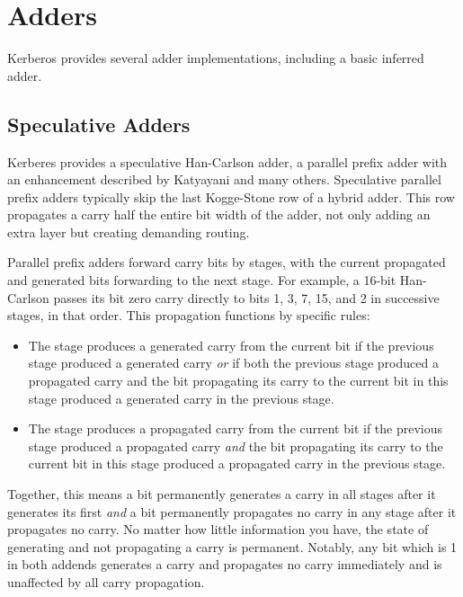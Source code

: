 \chapter{Adders}

Kerberos provides several adder implementations, including a basic inferred
adder.

\section{Speculative Adders}

Kerberes provides a speculative Han-Carlson adder, a parallel prefix adder with
an enhancement described by Katyayani and many others.  Speculative parallel
prefix adders typically skip the last Kogge-Stone row of a hybrid adder.  This
row propagates a carry half the entire bit width of the adder, not only adding
an extra layer but creating demanding routing.

Parallel prefix adders forward carry bits by stages, with the current
propagated and generated bits forwarding to the next stage.  For example, a
16-bit Han-Carlson passes its bit zero carry directly to bits 1, 3, 7, 15, and
2 in successive stages, in that order.  This propagation functions by specific
rules:

\begin{itemize}
    \item The stage produces a generated carry from the current bit if the
    previous stage produced a generated carry {\em or} if both the previous
    stage produced a propagated carry and the bit propagating its carry to the
    current bit in this stage produced a generated carry in the previous stage.

    \item The stage produces a propagated carry from the current bit if the
    previous stage produced a propagated carry {\em and} the bit propagating
    its carry to the current bit in this stage produced a propagated carry
    in the previous stage.
\end{itemize}

Together, this means a bit permanently generates a carry in all stages after it
generates its first {\em and} a bit permanently propagates no carry in any
stage after it propagates no carry.  No matter how little information you have,
the state of generating and not propagating a carry is permanent.  Notably, any
bit which is 1 in both addends generates a carry and propagates no carry
immediately and is unaffected by all carry propagation.

